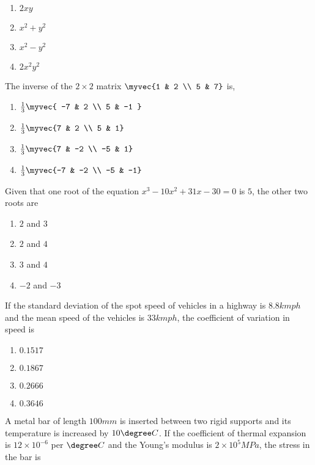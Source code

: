 	\begin{enumerate}
                \item $2xy$
                \item $x^2+y^2$
                \item $x^2-y^2$
                \item $2x^2y^2$  
        \end{enumerate}
\item The inverse of the $2 \times 2$  matrix $\myvec{1 & 2 \\ 5 & 7}$  is,
\begin{enumerate}
	\item $\frac{1}{3} \myvec{ -7 & 2 \\ 5 & -1 }$\\
\item $ \frac{1}{3} \myvec{7 & 2 \\ 5 & 1}$\\
\item $\frac{1}{3} \myvec{7 & -2 \\ -5 & 1}$\\
\item $\frac{1}{3} \myvec{-7 & -2 \\ -5 & -1}$\\
		\end{enumerate}
\item Given that one root of the equation $x^3-10x^2+31x-30=0$ is $5$, the other two roots are
\begin{enumerate}
                \item $2$ and $3$
                \item $2$ and $4$
                \item $3$ and $4$
                \item $-2$ and $-3$
        \end{enumerate}
\item If the standard deviation of the spot speed of vehicles in a highway is $8.8 kmph$ and the mean speed of the vehicles is $33 kmph$, the coefficient of variation in speed is 
	\begin{enumerate}
                \item $0.1517$
                \item $0.1867$
                \item $0.2666$
                \item $0.3646$
        \end{enumerate}
\item A metal bar of length $100 mm$ is inserted between two rigid supports and its temperature is increased by $10{\degree}C$. If the coefficient of thermal expansion is $12 \times 10^{-6}$ per ${\degree}C$ and the Young's modulus is $2 \times 10^5 MPa$, the stress in the bar is 
